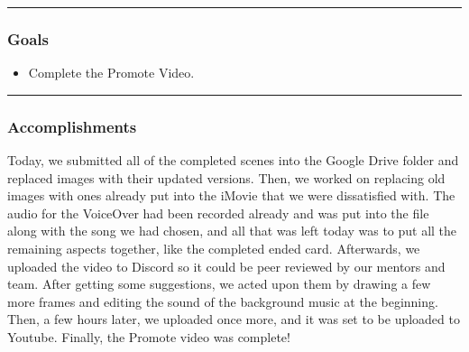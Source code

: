 \noindent\hfil\rule{\textwidth}{.4pt}\hfil
\subsubsection*{Goals}
\begin{itemize}
    \item Complete the Promote Video. 

\end{itemize} 

\noindent\hfil\rule{\textwidth}{.4pt}\hfil

\subsubsection*{Accomplishments}
Today, we submitted all of the completed scenes into the Google Drive folder and replaced images with their updated versions. Then, we worked on replacing old images with ones already put into the iMovie that we were dissatisfied with. The audio for the VoiceOver had been recorded already and was put into the file along with the song we had chosen, and all that was left today was to put all the remaining aspects together, like the completed ended card. Afterwards, we uploaded the video to Discord so it could be peer reviewed by our mentors and team. After getting some suggestions, we acted upon them by drawing a few more frames and editing the sound of the background music at the beginning. Then, a few hours later, we uploaded once more, and it was set to be uploaded to Youtube. Finally, the Promote video was complete!


